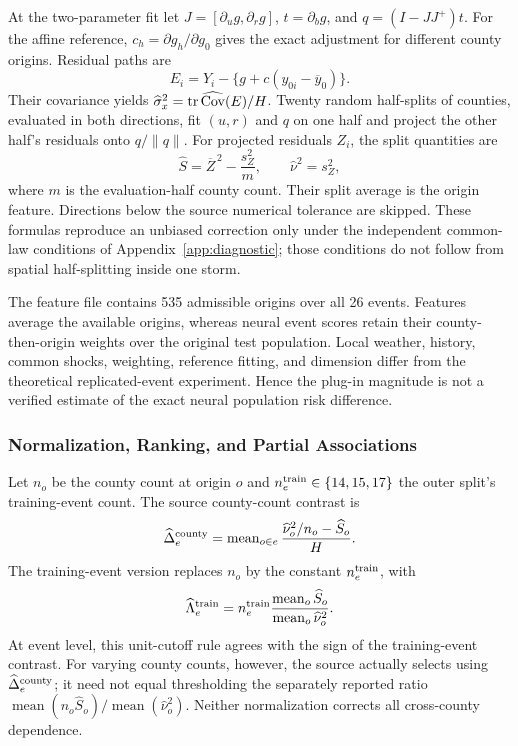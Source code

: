 At the two-parameter fit let $J=[\partial_u g,\partial_r g]$, $t=\partial_b g$, and $q=(I-JJ^+)t$. For the affine reference, $c_h=\partial g_h/\partial g_0$ gives the exact adjustment for different county origins. Residual paths are
\[
 E_i=Y_i-\{g+c(y_{0i}-\overline y_0)\}.
\]
Their covariance yields $\widehat\sigma_x^2=\operatorname{tr}\widehat{\operatorname{Cov}}(E)/H$. Twenty random half-splits of counties, evaluated in both directions, fit $(u,r)$ and $q$ on one half and project the other half's residuals onto $q/\|q\|$. For projected residuals $Z_i$, the split quantities are
\[
 \widehat S=\overline Z^{\,2}-\frac{s_Z^2}{m},\qquad
 \widehat\nu^2=s_Z^2,
\]
where $m$ is the evaluation-half county count. Their split average is the origin feature. Directions below the source numerical tolerance are skipped. These formulas reproduce an unbiased correction only under the independent common-law conditions of Appendix~\ref{app:diagnostic}; those conditions do not follow from spatial half-splitting inside one storm.

The feature file contains 535 admissible origins over all 26 events. Features average the available origins, whereas neural event scores retain their county-then-origin weights over the original test population. Local weather, history, common shocks, weighting, reference fitting, and dimension differ from the theoretical replicated-event experiment. Hence the plug-in magnitude is not a verified estimate of the exact neural population risk difference.

\subsubsection{Normalization, Ranking, and Partial Associations}
Let $n_o$ be the county count at origin $o$ and $n_e^{\rm train}\in\{14,15,17\}$ the outer split's training-event count. The source county-count contrast is
\[
 \widehat\Delta_e^{\rm county}
 =\operatorname{mean}_{o\in e}\frac{\widehat\nu_o^2/n_o-\widehat S_o}{H}.
\]
The training-event version replaces $n_o$ by the constant $n_e^{\rm train}$, with
\[
 \widehat\Lambda_e^{\rm train}
 =n_e^{\rm train}\frac{\operatorname{mean}_o\widehat S_o}
                         {\operatorname{mean}_o\widehat\nu_o^2}.
\]
At event level, this unit-cutoff rule agrees with the sign of the training-event contrast. For varying county counts, however, the source actually selects using $\widehat\Delta_e^{\rm county}$; it need not equal thresholding the separately reported ratio $\operatorname{mean}(n_o\widehat S_o)/\operatorname{mean}(\widehat\nu_o^2)$. Neither normalization corrects all cross-county dependence.

